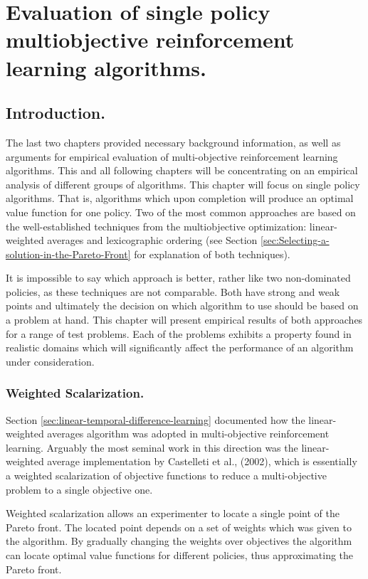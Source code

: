 \chapter{Evaluation of single policy multiobjective reinforcement learning algorithms.}

\section{Introduction.}
The last two chapters provided necessary background information, as well as arguments for empirical evaluation of multi-objective reinforcement learning algorithms. This and all following chapters will be concentrating on an empirical analysis of different groups of algorithms. This chapter will focus on single policy algorithms. That is, algorithms which upon completion will produce an optimal value function for one policy. Two of the most common approaches are based on the well-established techniques from the multiobjective optimization: linear-weighted averages and lexicographic ordering (see Section \ref{sec:Selecting-a-solution-in-the-Pareto-Front} for explanation of both techniques).

It is impossible to say which approach is better, rather like two non-dominated policies, as these techniques are not comparable. Both have strong and weak points and ultimately the decision on which algorithm to use should be based on a problem at hand. This chapter will present empirical results of both approaches for a range of test problems. Each of the problems exhibits a property found in realistic domains which will significantly affect the performance of an algorithm under consideration.

\subsection{Weighted Scalarization.}
Section \ref{sec:linear-temporal-difference-learning} documented how the linear-weighted averages algorithm was adopted in multi-objective reinforcement learning. Arguably the most seminal work in this direction was the linear-weighted average implementation by Castelleti et al., (2002\nocite{castelletti2002reinforcement}), which is essentially a weighted scalarization of objective functions to reduce a multi-objective problem to a single objective one.

Weighted scalarization allows an experimenter to locate a single point of the Pareto front. The located point depends on a set of weights which was given to the algorithm. By gradually changing the weights over objectives the algorithm can locate optimal value functions for different policies, thus approximating the Pareto front.

